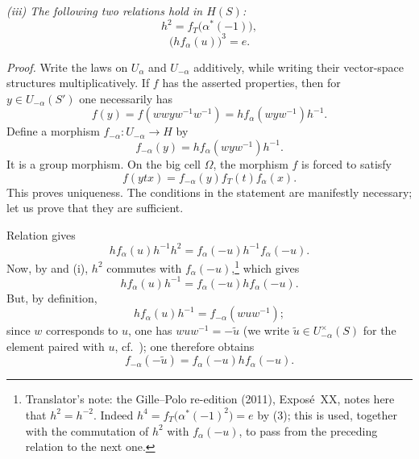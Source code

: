 \emph{\textup{(iii)} The following two relations hold in \(H(S)\):}
\begin{equation}
\tag{3}\label{sga3:xx:theorem:6-2:equation:3}
 h^2=f_T\bigl(\alpha^\ast(-1)\bigr),
\end{equation}
\begin{equation}
\tag{4}\label{sga3:xx:theorem:6-2:equation:4}
 \bigl(hf_\alpha(u)\bigr)^3=e.
\end{equation}

\smallskip
\noindent\emph{Proof.}
Write the laws on \(U_\alpha\) and \(U_{-\alpha}\) additively, while
writing their vector-space structures multiplicatively.  If \(f\)
has the asserted properties, then for
\(y\in U_{-\alpha}(S')\) one necessarily has
\[
 f(y)
 =f(wwyw^{-1}w^{-1})
 =h f_\alpha(wyw^{-1})h^{-1}.
\]
Define a morphism \(f_{-\alpha}\colon U_{-\alpha}\to H\) by
\[
 f_{-\alpha}(y)=h f_\alpha(wyw^{-1})h^{-1}.
\]
It is a group morphism.  On the big cell \(\Omega\), the morphism
\(f\) is forced to satisfy
\[
 f(ytx)=f_{-\alpha}(y)f_T(t)f_\alpha(x).
\]
This proves uniqueness.  The conditions in the statement are
manifestly necessary; let us prove that they are sufficient.

Relation \textup{} gives
\[
 h f_\alpha(u)h^{-1}h^2
 =
 f_\alpha(-u)h^{-1}f_\alpha(-u).
\]
Now, by \textup{} and \textup{(i)},
\(h^2\) commutes with \(f_\alpha(-u)\),\footnote{Translator's note: the Gille--Polo re-edition (2011), Exposé~XX, notes here that \(h^2=h^{-2}\).
Indeed \(h^4=f_T\bigl(\alpha^\ast(-1)^2\bigr)=e\) by \textup{(3)}; this is used, together with the
commutation of \(h^2\) with \(f_\alpha(-u)\), to pass from the preceding relation to the next one.}
which gives
\[
 h f_\alpha(u)h^{-1}
 =
 f_\alpha(-u)h f_\alpha(-u).
\]
But, by definition,
\[
 h f_\alpha(u)h^{-1}=f_{-\alpha}(wuw^{-1});
\]
since \(w\) corresponds to \(u\), one has \(wuw^{-1}=-\widetilde u\)
\textup{(}we write \(\widetilde u\in U_{-\alpha}^\times(S)\) for the
element paired with \(u\), cf.\ \textup{)}; one therefore obtains
\[
 f_{-\alpha}(-\widetilde u)
 =
 f_\alpha(-u)h f_\alpha(-u).
\]

